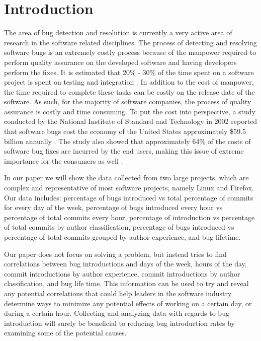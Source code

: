 \documentclass[preprint, 11pt]{sigplanconf}
\begin{document}
\section{Introduction}

The area of bug detection and resolution is currently a very active area of research
in the software related disciplines. The process of detecting and resolving software
bugs is an extremely costly process because of the manpower required to perform
quality assurance on the developed software and having developers perform the fixes.
It is estimated that 20\% - 30\% of the time spent on a software project is spent on
testing and integration \cite{2004-industry}. In addition to the cost of manpower,
the time required to complete these tasks can be costly on the release date of the
software. As such, for the majority of software companies, the process of quality
assurance is costly and time consuming. To put the cost into perspective, a study
conducted by the National Institute of Standard and Technology in 2002 reported that
software bugs cost the economy of the United States approximately \$59.5 billion
annually \cite{2002-economic}. The study also showed that approximately 64\% of
the costs of software bug fixes are incurred by the end users, making this issue
of extreme importance for the consumers as well \cite{2002-economic}.

In our paper we will show the data collected from two large projects, which
are complex and representative of most software projects, namely Linux and Firefox.
Our data includes: percentage of bugs introduced vs total percentage of commits for
every day of the week, percentage of bugs introduced every hour vs percentage of total commits
every hour, percentage of introduction vs percentage of total commits by author classification,
percentage of bugs introduced vs percentage of total commits grouped by author experience,
and bug lifetime.

Our paper does not focus on solving a problem, but instead tries to find correlations between
bug introductions and days of the week, hours of the day, commit introductions by author
experience, commit introductions by author classification, and bug life time. This information
can be used to try and reveal any potential correlations that could help leaders
in the software industry determine ways to minimize any potential effects
of working on a certain day, or during a certain hour. Collecting and analyzing
data with regards to bug introduction will surely be beneficial to reducing bug
introduction rates by examining some of the potential causes.
\end{document}
